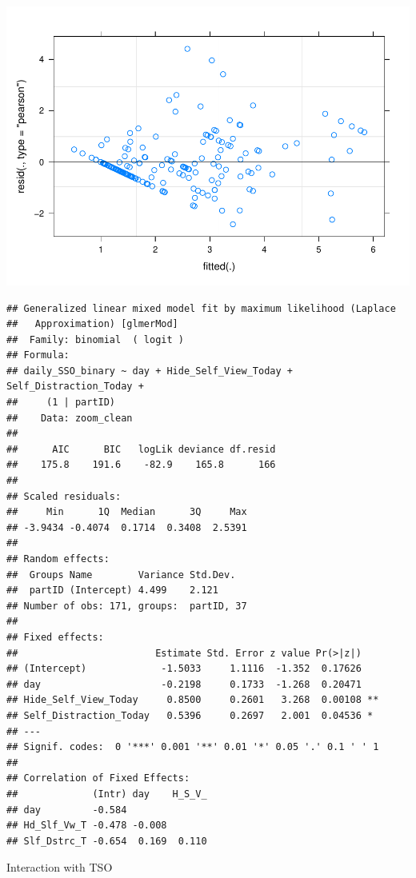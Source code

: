 \documentclass[
  english,
  man]{apa7}
\begin{document}
\includegraphics{zoom_sso_manuscript_files/figure-latex/unnamed-chunk-3-1.pdf}

\begin{verbatim}
## Generalized linear mixed model fit by maximum likelihood (Laplace
##   Approximation) [glmerMod]
##  Family: binomial  ( logit )
## Formula: 
## daily_SSO_binary ~ day + Hide_Self_View_Today + Self_Distraction_Today +  
##     (1 | partID)
##    Data: zoom_clean
## 
##      AIC      BIC   logLik deviance df.resid 
##    175.8    191.6    -82.9    165.8      166 
## 
## Scaled residuals: 
##     Min      1Q  Median      3Q     Max 
## -3.9434 -0.4074  0.1714  0.3408  2.5391 
## 
## Random effects:
##  Groups Name        Variance Std.Dev.
##  partID (Intercept) 4.499    2.121   
## Number of obs: 171, groups:  partID, 37
## 
## Fixed effects:
##                        Estimate Std. Error z value Pr(>|z|)   
## (Intercept)             -1.5033     1.1116  -1.352  0.17626   
## day                     -0.2198     0.1733  -1.268  0.20471   
## Hide_Self_View_Today     0.8500     0.2601   3.268  0.00108 **
## Self_Distraction_Today   0.5396     0.2697   2.001  0.04536 * 
## ---
## Signif. codes:  0 '***' 0.001 '**' 0.01 '*' 0.05 '.' 0.1 ' ' 1
## 
## Correlation of Fixed Effects:
##             (Intr) day    H_S_V_
## day         -0.584              
## Hd_Slf_Vw_T -0.478 -0.008       
## Slf_Dstrc_T -0.654  0.169  0.110
\end{verbatim}

Interaction with TSO
\end{document}
